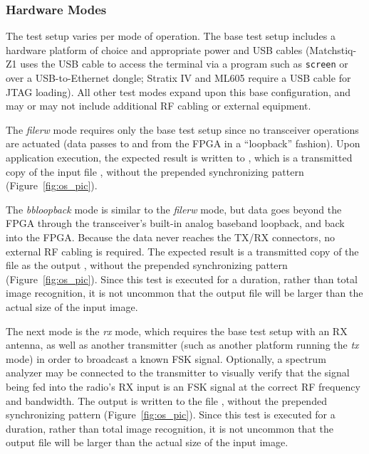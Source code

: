 \subsubsection{Hardware Modes}
The test setup varies per mode of operation. The base test setup includes a hardware platform of choice and appropriate power and USB cables (Matchstiq-Z1 uses the USB cable to access the terminal via a program such as \texttt{screen} or over a USB-to-Ethernet dongle; Stratix IV and ML605 require a USB cable for JTAG loading). All other test modes expand upon this base configuration, and may or may not include additional RF cabling or external equipment.\par\medskip
The \textit{filerw} mode requires only the base test setup since no transceiver operations are actuated (data passes to and from the FPGA in a ``loopback'' fashion). Upon application execution, the expected result is written to , which is a transmitted copy of the input file , without the prepended synchronizing pattern  (Figure~\ref{fig:os_pic}).\par\medskip
The \textit{bbloopback} mode is similar to the \textit{filerw} mode, but data goes beyond the FPGA through the transceiver's built-in analog baseband loopback, and back into the FPGA. Because the data never reaches the TX/RX connectors, no external RF cabling is required. The expected result is a transmitted copy of the  file as the output , without the prepended synchronizing pattern (Figure~\ref{fig:os_pic}). Since this test is executed for a duration, rather than total image recognition, it is not uncommon that the output file will be larger than the actual size of the input image.\par\medskip
The next mode is the \textit{rx} mode, which requires the base test setup with an RX antenna, as well as another transmitter (such as another platform running the \textit{tx} mode) in order to broadcast a known FSK signal. Optionally, a spectrum analyzer may be connected to the transmitter to visually verify that the signal being fed into the radio's RX input is an FSK signal at the correct RF frequency and bandwidth. The output is written to the file , without the prepended synchronizing pattern (Figure~\ref{fig:os_pic}). Since this test is executed for a duration, rather than total image recognition, it is not uncommon that the output file will be larger than the actual size of the input image.\par\medskip
